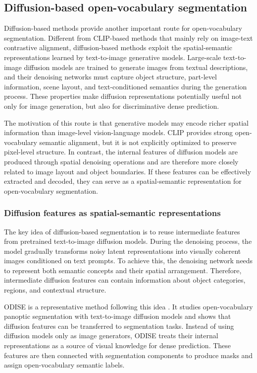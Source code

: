 \subsection{Diffusion-based open-vocabulary segmentation}
\label{subsec:diffusion_based_segmentation}

Diffusion-based methods provide another important route for open-vocabulary segmentation. 
Different from CLIP-based methods that mainly rely on image-text contrastive alignment, diffusion-based methods exploit the spatial-semantic representations learned by text-to-image generative models. 
Large-scale text-to-image diffusion models are trained to generate images from textual descriptions, and their denoising networks must capture object structure, part-level information, scene layout, and text-conditioned semantics during the generation process. 
These properties make diffusion representations potentially useful not only for image generation, but also for discriminative dense prediction.

The motivation of this route is that generative models may encode richer spatial information than image-level vision-language models. 
CLIP provides strong open-vocabulary semantic alignment, but it is not explicitly optimized to preserve pixel-level structure. 
In contrast, the internal features of diffusion models are produced through spatial denoising operations and are therefore more closely related to image layout and object boundaries. 
If these features can be effectively extracted and decoded, they can serve as a spatial-semantic representation for open-vocabulary segmentation.

\subsubsection{Diffusion features as spatial-semantic representations}

The key idea of diffusion-based segmentation is to reuse intermediate features from pretrained text-to-image diffusion models. 
During the denoising process, the model gradually transforms noisy latent representations into visually coherent images conditioned on text prompts. 
To achieve this, the denoising network needs to represent both semantic concepts and their spatial arrangement. 
Therefore, intermediate diffusion features can contain information about object categories, regions, and contextual structure.

ODISE is a representative method following this idea \cite{Xu2023a}. 
It studies open-vocabulary panoptic segmentation with text-to-image diffusion models and shows that diffusion features can be transferred to segmentation tasks. 
Instead of using diffusion models only as image generators, ODISE treats their internal representations as a source of visual knowledge for dense prediction. 
These features are then connected with segmentation components to produce masks and assign open-vocabulary semantic labels.

